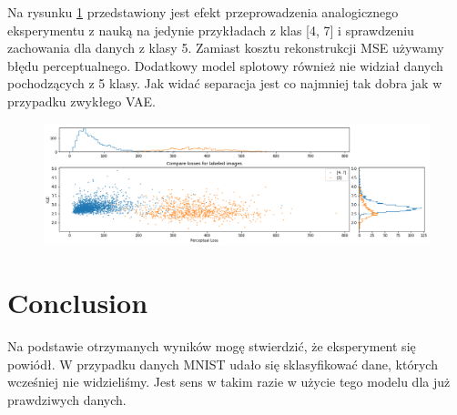 Na rysunku \ref{fig:dfc_mnist_compare} przedstawiony jest efekt przeprowadzenia analogicznego eksperymentu z nauką na jedynie przykładach z klas [4, 7] i sprawdzeniu zachowania dla danych z klasy 5. Zamiast kosztu rekonstrukcji MSE używamy błędu perceptualnego. Dodatkowy model splotowy również nie widział danych pochodzących z 5 klasy. Jak widać separacja jest co najmniej tak dobra jak w przypadku zwykłego VAE.

\begin{figure}[h!]
    \centering
    \includegraphics[width=1.0\textwidth]{images/dfc_mnist_compare}
    \caption{}
    \label{fig:dfc_mnist_compare}
\end{figure}

\section{Conclusion}

Na podstawie otrzymanych wyników mogę stwierdzić, że eksperyment się powiódł. W przypadku danych MNIST udało się sklasyfikować dane, których wcześniej nie widzieliśmy. Jest sens w takim razie w użycie tego modelu dla już prawdziwych danych.
